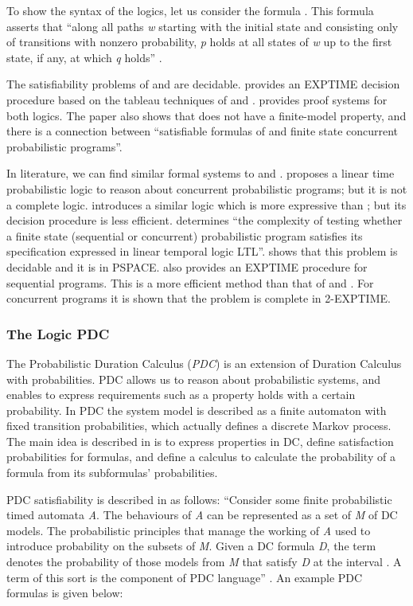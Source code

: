 \documentclass[11pt]{article}
\begin{document}
To show the syntax of the logics, let us consider the formula . This formula asserts that ``along all paths \emph{w} starting with the initial state and consisting only of transitions with nonzero probability, \emph{p} holds at all states of \emph{w} up to the first state, if any, at which \emph{q} holds'' \cite{HS84}.

The satisfiability problems of   and  are decidable. \cite{HS84} provides an EXPTIME decision procedure based on the tableau techniques of \cite{BMP81} and \cite{CE82}. \cite{HS84}  provides proof systems for both logics. The paper also shows that  does not have a finite-model property, and there is a connection between ``satisfiable formulas of  and finite state concurrent probabilistic programs''.

In literature, we can find similar formal systems to   and . \cite{Pnu83} proposes a linear time probabilistic logic to reason about concurrent probabilistic programs; but it is not a complete logic.  \cite{LS83} introduces a similar logic which is more expressive than ; but its decision procedure is less efficient. \cite{CY88} determines ``the complexity of testing whether a finite state (sequential or concurrent) probabilistic program satisfies its specification expressed in linear temporal logic LTL''. \cite{CY88} shows that this problem is decidable and it is in PSPACE. \cite{CY88} also provides an EXPTIME procedure for sequential programs. This is a more efficient method than that of  and . For concurrent programs it is shown that the problem is complete in 2-EXPTIME.

\subsubsection{The Logic PDC}

The Probabilistic Duration Calculus (\textit{PDC})  \cite{LRSZ92} is an extension of Duration Calculus \cite{CHR91} with probabilities. PDC allows us to reason about probabilistic systems, and enables to express requirements such as a property holds with a certain probability. In PDC the system model is described as a finite automaton with fixed transition probabilities, which actually defines a discrete Markov process. The main idea is described in \cite{LRSZ92} is to express properties in DC, define satisfaction probabilities for formulas, and define a calculus to calculate the probability of a formula from its  subformulas' probabilities.  

PDC satisfiability is described in \cite{LRSZ92} as follows: ``Consider some finite probabilistic timed automata \textit{A}. The behaviours of \textit{A} can be represented as a set of \textit{M} of DC models. The probabilistic principles that manage the working of \textit{A} used to introduce probability on the subsets of \textit{M}. Given a DC formula \textit{D}, the term  denotes the probability of those models from \textit{M} that satisfy \textit{D} at the interval . A term of this sort is the component of PDC language'' \cite{LRSZ92}. An example PDC formulas is given below:
\end{document}
